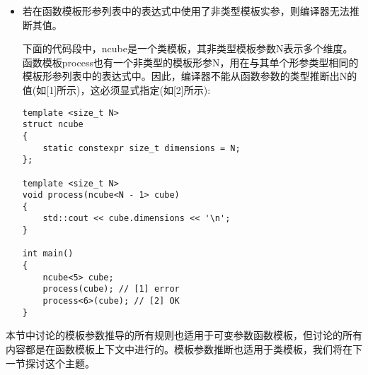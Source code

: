 \begin{itemize}
\item
若在函数模板形参列表中的表达式中使用了非类型模板实参，则编译器无法推断其值。

下面的代码段中，ncube是一个类模板，其非类型模板参数N表示多个维度。函数模板process也有一个非类型的模板形参N，用在与其单个形参类型相同的模板形参列表中的表达式中。因此，编译器不能从函数参数的类型推断出N的值(如[1]所示)，这必须显式指定(如[2]所示):

\begin{lstlisting}[style=styleCXX]
template <size_t N>
struct ncube
{
	static constexpr size_t dimensions = N;
};

template <size_t N>
void process(ncube<N - 1> cube)
{
	std::cout << cube.dimensions << '\n';
}

int main()
{
	ncube<5> cube;
	process(cube); // [1] error
	process<6>(cube); // [2] OK
}
\end{lstlisting}
\end{itemize}

本节中讨论的模板参数推导的所有规则也适用于可变参数函数模板，但讨论的所有内容都是在函数模板上下文中进行的。模板参数推断也适用于类模板，我们将在下一节探讨这个主题。













































